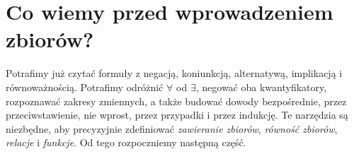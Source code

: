 \section{Co wiemy przed wprowadzeniem zbiorów?}
\label{sec:logic-to-sets}
Potrafimy już czytać formuły z negacją, koniunkcją,
alternatywą, implikacją i równoważnością. Potrafimy
odróżnić $\forall$ od $\exists$, negować oba
kwantyfikatory, rozpoznawać zakresy zmiennych,
a także budować dowody bezpośrednie, przez
przeciwstawienie, nie wprost, przez przypadki
i przez indukcję. Te narzędzia są niezbędne,
aby precyzyjnie zdefiniować \emph{zawieranie zbiorów},
\emph{równość zbiorów}, \emph{relacje} i
\emph{funkcje}. Od tego rozpoczniemy następną część.
